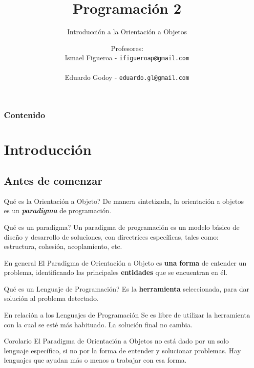 \documentclass{beamer}
\title[\textbf{Programación 2}]{\textbf{Programación 2}}
\subtitle{Introducción a la Orientación a Objetos}
\author[IF-EG]
{Profesores:\\
  Ismael Figueroa -  \texttt{\small ifigueroap@gmail.com} \\
  \vspace{0.5mm} \\
  Eduardo Godoy - \texttt{\small eduardo.gl@gmail.com}
}
\institute[Universidad de Valparaíso]
\date{}
\begin{document}
\begin{frame}
  \titlepage
\end{frame}

\begin{frame}
  \frametitle{Contenido}
  \tableofcontents%
\end{frame}

\section{Introducción}

\subsection{Antes de comenzar}

\begin{frame}

  \begin{block}{\textquestiondown Qué es la Orientación a Objeto?}
    De manera sintetizada, la orientación a objetos es un \textbf{{\em
        paradigma}} de programación.
  \end{block}

  \begin{block}{\textquestiondown Qué es un paradigma?}
    Un paradigma de programación es un modelo básico de dise\~no y
    desarrollo de soluciones, con directrices específicas, tales como:
    estructura, cohesión, acoplamiento, etc.
  \end{block}
  
  \begin{exampleblock}{En general}
    El Paradigma de Orientación a Objeto es \textbf{una forma} de
    entender un problema, identificando las principales
    \textbf{entidades} que se encuentran en él.
  \end{exampleblock}
\end{frame}

\begin{frame}

  \begin{block}{\textquestiondown Qué es un Lenguaje de Programación?}
    Es la \textbf{herramienta} seleccionada, para dar solución al
    problema detectado.
  \end{block}

  \begin{block}{En relación a los Lenguajes de Programación}
    Se es libre de utilizar la herramienta con la cual se esté más
    habituado. La solución final no cambia.
  \end{block}
  
  \begin{exampleblock}{Corolario}
    El Paradigma de Orientación a Objetos no está dado por un solo
    lenguaje específico, si no por la forma de entender y solucionar
    problemas. Hay lenguajes que ayudan más o menos a trabajar con esa
    forma.
  \end{exampleblock}
\end{frame}
\end{document}
